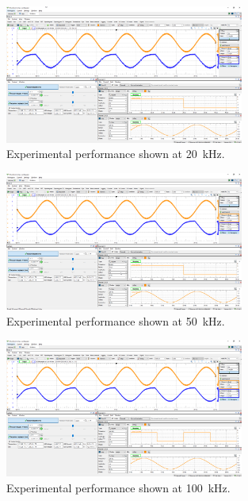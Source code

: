 \documentclass{article}
\begin{document}
	\begin{figure}[H]
	    \centering
	    \includegraphics[width=0.7\textwidth]{2a2_20}
	    \caption{Experimental performance shown at \SI{20}{\kHz}.}
	\end{figure}

	\begin{figure}[H]
	    \centering
	    \includegraphics[width=0.7\textwidth]{2a2_50}
	    \caption{Experimental performance shown at \SI{50}{\kHz}.}
	\end{figure}

	\begin{figure}[H]
	    \centering
	    \includegraphics[width=0.7\textwidth]{2a2_100}
	    \caption{Experimental performance shown at \SI{100}{\kHz}.}
	\end{figure}
\end{document}
